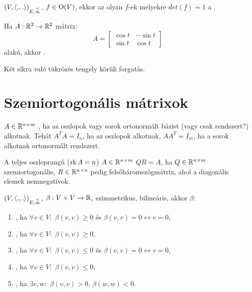 \begin{jel}
\end{jel}

\begin{ff}
	$(V,\langle.,.\rangle)_{E,\overset{<}{\infty}}$, $f\in\operatorname{O}(V)$, ekkor az olyan $f$-ek melyekre $det(f)=1$ a
	.
\end{ff}

\begin{jel}
\end{jel}



\begin{ff}
	Ha $A:\mathbb{R}^2\to \mathbb{R}^2$ mátrix:
	\begin{equation*}
		A=	
		\begin{bmatrix}
			\cos t & -\sin t\\
			\sin t & \cos t
		\end{bmatrix}
	\end{equation*}
	alakú, akkor .
\end{ff}

\begin{jel}
\end{jel}


\begin{kov}
	Két síkra való tükrözés tengely körüli forgatás.
\end{kov}


\section{Szemiortogonális mátrixok}
\begin{ff}
	$A\in\mathbb{R}^{n\times m}$ , ha az oszlopok vagy sorok ortonormált
	bázist (vagy csak rendszert?) alkotnak. Tehát $A^TA=I_n$, ha az oszlopok
	alkotnak, $AA^T=I_m$, ha a sorok alkotnak ortonormált rendszert.
\end{ff}
\begin{ff}
	A teljes oszloprangú ($\operatorname{rk}{A}=n$) $A\in\mathbb{R}^{n\times m}$  $QR=A$, ha
	$Q\in\mathbb{R}^{n\times m}$ szemiortogonális, $R\in\mathbb{R}^{n\times n}$ pedig felsőháromszögmátrix, ahol a
	diagonális elemek nemnegatívok.
\end{ff}
\begin{ff}
	$(V,\langle.,.\rangle)_{E,\overset{<}{\infty}}$, $\beta:V\times V\to \mathbb{R}$, szimmetrikus, bilineáris, akkor
$\beta:$	
	\begin{enumerate}
		\item {}, ha $\forall v\in V:$ $\beta(v,v)\ge 0$ és
			$\beta(v,v)=0\leftrightarrow v=0$,
		\item {}, ha $\forall v\in V:$ $\beta(v,v)\ge 0$,
		\item {}, ha $\forall v\in V:$ $\beta(v,v)\leq 0$ és
			$\beta(v,v)=0\leftrightarrow v=0$,
		\item {}, ha $\forall v\in V:$ $\beta(v,v)\leq 0$,
		\item {}, ha $\exists v,w:$ $\beta(v,v)>0$, $\beta(w,w)<0$.
	\end{enumerate}
\end{ff}
